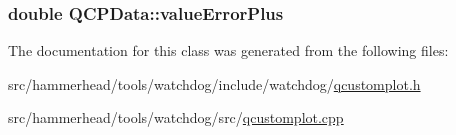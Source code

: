 \subsubsection[{\texorpdfstring{value\+Error\+Plus}{valueErrorPlus}}]{\setlength{\rightskip}{0pt plus 5cm}double Q\+C\+P\+Data\+::value\+Error\+Plus}\hypertarget{classQCPData_ad26912552d03485ea20d91dcad16aa8f}{}\label{classQCPData_ad26912552d03485ea20d91dcad16aa8f}


The documentation for this class was generated from the following files\+:\begin{DoxyCompactItemize}
\item 
src/hammerhead/tools/watchdog/include/watchdog/\hyperlink{qcustomplot_8h}{qcustomplot.\+h}\item 
src/hammerhead/tools/watchdog/src/\hyperlink{qcustomplot_8cpp}{qcustomplot.\+cpp}\end{DoxyCompactItemize}

